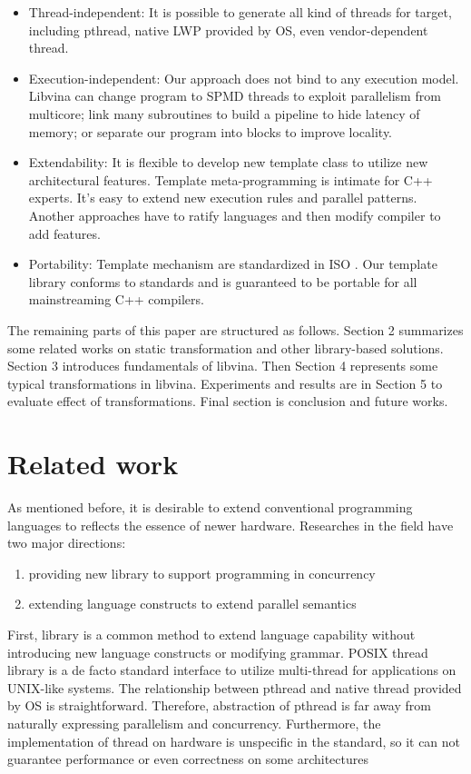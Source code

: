 \documentclass[10pt, conference, compsocconf]{IEEEtran}
\begin{document}
\begin{itemize}
\item Thread-independent:  It is possible to generate all kind of threads for target, including pthread, native LWP provided by OS, even vendor-dependent thread. 

\item Execution-independent:  Our approach does not bind to any execution model. Libvina can change program to SPMD threads to exploit parallelism from multicore; link many subroutines to build a pipeline to hide latency of memory; or separate our program into blocks to improve locality. 

\item Extendability:  It is flexible to develop new template class to utilize new architectural features. Template meta-programming is intimate for C++ experts. It's easy to extend new execution rules and parallel patterns. Another approaches have to ratify languages and then modify compiler to add features.

\item Portability: Template mechanism are standardized in ISO \cite{b8, b17}. Our template library conforms to standards and is guaranteed to be portable for all mainstreaming C++ compilers.
\end{itemize}

The remaining parts of this paper are structured as follows. Section 2 summarizes some related works on static transformation and other library-based solutions. Section 3 introduces fundamentals of libvina. Then Section 4 represents some typical transformations in libvina. Experiments and results are in Section 5 to evaluate effect of transformations. Final section is conclusion and future works.

\section{Related work}
As mentioned before, it is desirable to extend conventional programming languages to reflects the essence of newer hardware. Researches in the field have two major directions:
\begin{enumerate}
\item providing new library to support programming in concurrency
\item extending language constructs to extend parallel semantics
\end{enumerate}

First, library is a common method to extend language capability without introducing new language constructs or modifying grammar. POSIX thread library is a de facto standard interface to utilize multi-thread for applications on UNIX-like systems. The relationship between pthread and native thread provided by OS is straightforward. Therefore, abstraction of pthread is far away from naturally expressing parallelism and concurrency. Furthermore, the implementation of thread on hardware is unspecific in the standard, so it can not guarantee performance or even correctness on some architectures \cite{b4, b5}
\end{document}

